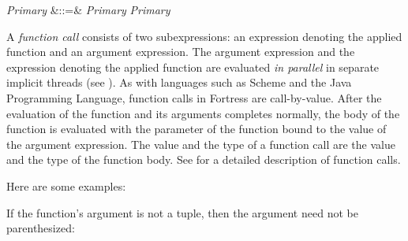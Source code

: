 
\begin{Grammar}
\emph{Primary} &::=& \emph{Primary} \emph{Primary}\\
\end{Grammar}


A \emph{function call} consists of two subexpressions: an expression
denoting the applied function and an argument expression.  The
argument expression and the expression denoting the applied function
are evaluated \emph{in parallel} in separate implicit threads (see
).  As with languages such as Scheme and
the Java Programming Language, function calls in Fortress are
call-by-value.  After the evaluation of the function and its arguments
completes normally,
the body of the function is evaluated with the parameter of the
function bound to the value of the argument expression.
The value and the type of a function call are the value and the type of
the function body.
See  for a detailed description of function calls.


Here are some examples:

If the function's argument is not a tuple, then the argument need not be
parenthesized:

